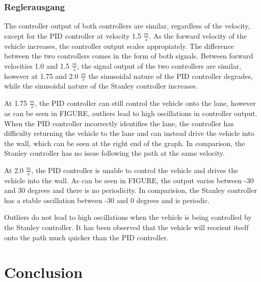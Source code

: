 \documentclass[arbeit=studie,oneside,BCOR=12mm]{ArbeitRST}
\begin{document}
\subsection{Reglerausgang}

The controller output of both controllers are similar, regardless of the
velocity, except for the PID controller at velocity 1.5 $\frac{m}{s}$. As the
forward velocity of the vehicle increases, the controller output scales
appropiately. The difference between the two controllers comes in the form of
both signals. Between forward velocities 1.0 and 1.5 $\frac{m}{s}$, the signal
output of the two controllers are similar, however at 1.75 and 2.0
$\frac{m}{s}$ the sinusoidal nature of the PID controller degrades, while the
sinusoidal nature of the Stanley controller increases. 

At 1.75 $\frac{m}{s}$, the PID controller can still control the vehicle onto
the lane, however as can be seen in FIGURE, outliers lead to high oscillations
in controller output. When the PID controller incorrectly identifies the lane,
the controller has difficulty returning the vehicle to the lane and can instead
drive the vehicle into the wall, which can be seen at the right end of the
graph. In comparison, the Stanley controller has no issue following the path at
the same velocity. 

At 2.0 $\frac{m}{s}$, the PID controller is unable to control the vehicle and
drives the vehicle into the wall. As can be seen in FIGURE, the output varies
between -30 and 30 degrees and there is no periodicity. In comparision, the
Stanley controller has a stable oscillation between -30 and 0 degrees and is
periodic.

Outliers do not lead to high oscillations when the vehicle is being controlled
by the Stanley controller. It has been observed that the vehicle will reorient
itself onto the path much quicker than the PID controller.



\chapter{Conclusion}

\iffalse
When comparing only the path following behaviour of both controllers, the PID
controller is still the best choice. However, when factoring in the other
aspects of the problem statement, the Stanley controller is a better fit for
the application. As the vehicle needs to be able to drive autonomously without
supervision at a higher velocity than it can originally, the Stanley controller
fulfills these requirements. 
\fi
\end{document}
